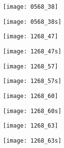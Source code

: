 %

\texttt{[image: 0568\_38]}

\texttt{[image: 0568\_38s]}

\texttt{[image: 1268\_47]}

\texttt{[image: 1268\_47s]}

\texttt{[image: 1268\_57]}

\texttt{[image: 1268\_57s]}

\texttt{[image: 1268\_60]}

\texttt{[image: 1268\_60s]}

\texttt{[image: 1268\_63]}

\texttt{[image: 1268\_63s]}

%